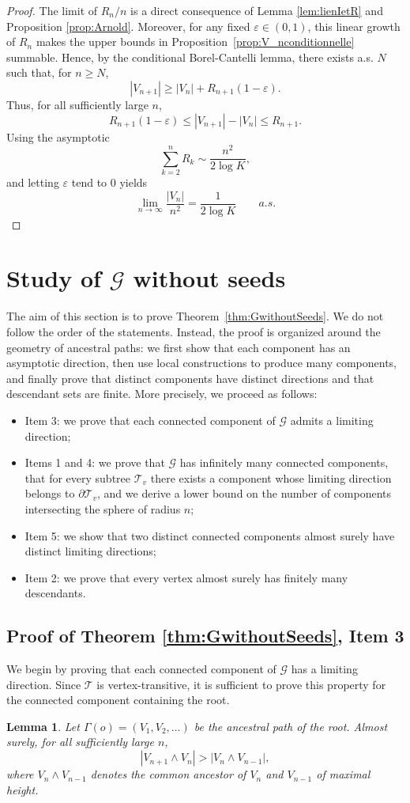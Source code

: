 \documentclass[french]{article}
\newtheorem{lemma}[theorem]{Lemma}
\newcommand{\T}{\mathcal{T}}
\renewcommand{\1}{\mathds{1}}
\begin{document}
\begin{proof} The limit of $R_n/n$ is a direct consequence of Lemma \ref{lem:lienIetR} and Proposition \ref{prop:Arnold}.
Moreover, for any fixed $\varepsilon\in(0,1)$, this linear growth of $R_n$ makes the upper bounds in Proposition~\ref{prop:V_nconditionnelle} summable. Hence, by the conditional Borel-Cantelli lemma, there exists a.s. $N$ such that, for $n\ge N$,
\begin{equation}\label{eq:minVn}
    |V_{n+1}| \ge |V_{n}|+ R_{n+1}(1-\varepsilon).
\end{equation}
Thus, for all sufficiently large $n$,
$$ R_{n+1}(1-\varepsilon) \le |V_{n+1}| - |V_{n}| \le  R_{n+1}.$$
Using the asymptotic
$$\sum_{k=2}^n R_k \sim \frac{n^2}{2\log K},$$
and letting $\varepsilon$ tend to 0 yields 
$$\lim_{n\to \infty} \frac{ |V_{n}|}{n^2}=  \frac{1}{2\log K}\qquad a.s.$$
\end{proof}


\section{Study of $\mathcal{G}$ without seeds}\label{s:Gwithoutseed}
The aim of this section is to prove Theorem~\ref{thm:GwithoutSeeds}. We do not follow the order of the statements. Instead, the proof is organized around the geometry of ancestral paths: we first show that each component has an asymptotic direction, then use local constructions to produce many components, and finally prove that distinct components have distinct directions and that descendant sets are finite. More precisely, we proceed as follows:
\begin{itemize}
    \item Item 3: we prove that each connected component of $\mathcal{G}$ admits a limiting direction;
    \item Items 1 and 4: we prove that $\mathcal{G}$ has infinitely many connected components, that for every subtree $\T_v$ there exists a component whose limiting direction belongs to $\partial\T_v$, and we derive a lower bound on the number of components intersecting the sphere of radius $n$;
    \item Item 5: we show that two distinct connected components almost surely have distinct limiting directions;    
    \item Item 2: we prove that every vertex almost surely has finitely many descendants.
\end{itemize}
\subsection{Proof of Theorem \ref{thm:GwithoutSeeds}, Item 3}
We begin by proving that each connected component of $\mathcal{G}$ has a limiting direction. Since $\T$ is vertex-transitive, it is sufficient to prove this property for the connected component containing the root. 
\begin{lemma} Let $\Gamma(o)=(V_1,V_2,\ldots)$ be the ancestral path of the root. Almost surely, for all sufficiently large $n$,
\[
 |V_{n+1} \wedge V_n| > |V_n \wedge V_{n-1}|,
\]
where $V_n\wedge V_{n-1}$ denotes the common ancestor of $V_n$ and $V_{n-1}$ of maximal height.
\end{lemma}
\end{document}
